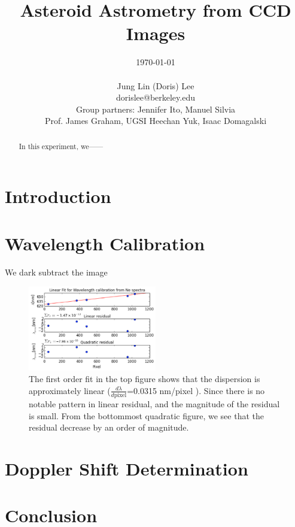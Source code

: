 \documentclass[authoryear, 12pt,5p, times]{elsarticle}
\begin{document}
\begin{frontmatter}
\title{Asteroid Astrometry from CCD Images}
\author{\today \\ \quad \\Jung Lin (Doris) Lee\\ dorislee@berkeley.edu\\Group partners: Jennifer Ito, Manuel Silvia\\Prof. James Graham, UGSI Heechan Yuk, Isaac Domagalski}
	\begin{abstract}
In this experiment,  we------
	\end{abstract}
\end{frontmatter}
\section{Introduction}
 
\section{Wavelength Calibration}
 We dark subtract the image 
 \begin{figure}[h!]
\includegraphics[width=0.5\textwidth]{figures/wavelength_calib}
\caption{The first order fit in the top figure shows that the dispersion is approximately linear ($\frac{d\lambda}{d\text{pixel}}$=0.0315 nm/pixel ). Since there is no notable pattern in linear residual, and the magnitude of the residual is small. From the bottommost quadratic figure, we see that the residual decrease by an order of magnitude.}
\label{calib}
\end{figure}
\section{Doppler Shift Determination}
\section{Conclusion}
 
\end{document}
